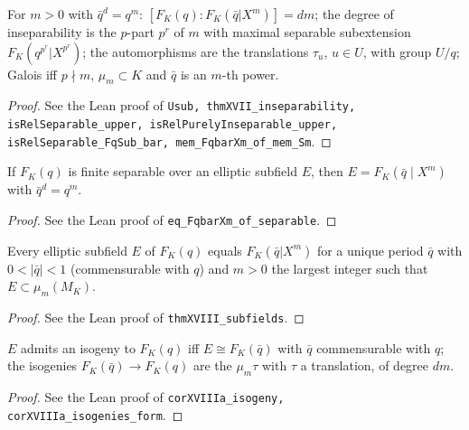 \begin{theorem}
\label{thm:XVII}
\leanok
For $m>0$ with $\bar q^d=q^m$: $[F_K(q):F_K(\bar q|X^m)]=dm$; the degree of inseparability is the $p$-part $p^r$ of $m$ with maximal separable subextension $F_K(q^{p^r}|X^{p^r})$; the automorphisms are the translations $\tau_u$, $u\in U$, with group $U/q$; Galois iff $p\nmid m$, $\mu_m\subset K$ and $\bar q$ is an $m$-th power.
\end{theorem}
\begin{proof}
\leanok
See the Lean proof of \texttt{Usub, thmXVII\_inseparability, isRelSeparable\_upper, isRelPurelyInseparable\_upper, isRelSeparable\_FqSub\_bar, mem\_FqbarXm\_of\_mem\_Sm}.
\end{proof}

\begin{theorem}
\label{thm:XVIII-sep}
\leanok
If $F_K(q)$ is finite separable over an elliptic subfield $E$, then $E=F_K(\bar q\mid X^m)$ with $\bar q^d=q^m$.
\end{theorem}
\begin{proof}
\leanok
See the Lean proof of \texttt{eq\_FqbarXm\_of\_separable}.
\end{proof}

\begin{theorem}
\label{thm:XVIII}
\leanok
Every elliptic subfield $E$ of $F_K(q)$ equals $F_K(\bar q|X^m)$ for a unique period $\bar q$ with $0<|\bar q|<1$ (commensurable with $q$) and $m>0$ the largest integer such that $E\subset\mu_m(M_K)$.
\end{theorem}
\begin{proof}
\leanok
See the Lean proof of \texttt{thmXVIII\_subfields}.
\end{proof}

\begin{corollary}
\label{cor:XVIIIa}
\leanok
$E$ admits an isogeny to $F_K(q)$ iff $E\cong F_K(\bar q)$ with $\bar q$ commensurable with $q$; the isogenies $F_K(\bar q)\to F_K(q)$ are the $\mu_m\tau$ with $\tau$ a translation, of degree $dm$.
\end{corollary}
\begin{proof}
\leanok
See the Lean proof of \texttt{corXVIIIa\_isogeny, corXVIIIa\_isogenies\_form}.
\end{proof}

